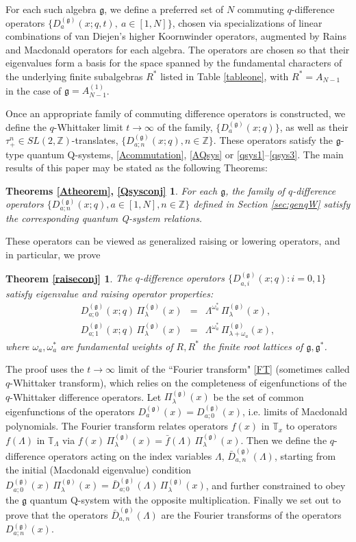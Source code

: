\documentclass[12pt]{amsart}
\newcommand{\barD}{\bar D}
\newcommand{\g}{{\mathfrak{g}}}
\newcommand{\Z}{{\mathbb Z}}
\newcommand{\lL}{{\Lambda}}
\numberwithin{equation}{section}
\begin{document}
For each such algebra $\g$, we define a preferred set of $N$ commuting $q$-difference operators $\{D_a^{(\g)}(x;q,t),\ a\in [1,N]\}$, chosen via specializations of linear combinations of van Diejen's higher Koornwinder operators, augmented by Rains and Macdonald operators for each algebra. The operators are chosen so that their eigenvalues form a basis for the space spanned by the fundamental characters of the underlying finite subalgebras $R^*$ listed in Table \ref{tableone}, with $R^*=A_{N-1}$ in the case of $\g=A_{N-1}^{(1)}$.

%
%
Once an appropriate family of commuting difference operators is constructed, we define the $q$-Whittaker limit $t\to\infty$ of the family, $\{D_{a}^{(\g)}(x;q)\}$, as well as their $\tau_+^n\in SL(2,\Z)$-translates, $\{D_{a;n}^{(\g)}(x;q), n\in\Z\}$. 
These operators satisfy the $\g$-type quantum Q-systems, \eqref{Acommutation}, \eqref{AQsys} or \eqref{qsys1}--\eqref{qsys3}. The main results of this paper may be stated as the following Theorems:

\newtheorem*{Atheorem}{Theorems \ref{Atheorem}, \ref{Qsysconj}}
\begin{Atheorem}
For each $\g$, the family of $q$-difference operators $\{D_{a;n}^{(\g)}(x;q), a\in[1,N], n\in\Z\}$ defined in Section \ref{sec:genqW} satisfy the corresponding quantum Q-system relations.
\end{Atheorem}
These operators can be viewed as generalized raising or lowering operators, and in particular, we prove
\newtheorem*{raiseconj}{Theorem \ref{raiseconj}}
\begin{raiseconj}
The $q$-difference operators $\{D_{a,i}^{(\g)}(x;q) : i=0,1\}$ satisfy eigenvalue and raising operator properties:
\begin{eqnarray*}
D_{a;0}^{(\g)}(x;q)\, \Pi_\lambda^{(\g)}(x)&=&\lL^{\omega_a^*}\,\Pi_\lambda^{(\g)}(x),\\
D_{a;1}^{(\g)}(x;q)\, \Pi_\lambda^{(\g)}(x)&=& \lL^{\omega_a^*}\, \Pi_{\lambda+\omega_a}^{(\g)}(x),
\end{eqnarray*}
where $\omega_a,\omega_a^*$ are fundamental weights of $R,R^*$ the finite root lattices of $\g,\g^*$.
\end{raiseconj}

The proof uses the $t\to\infty$ limit of the ``Fourier transform" \eqref{FT} (sometimes called $q$-Whittaker transform), which relies on the completeness of eigenfunctions of the $q$-Whittaker difference operators. Let $\Pi^{(\g)}_\lambda(x)$ be the set of common eigenfunctions of the operators $D_{a}^{(\g)}(x)=D_{a;0}^{(\g)}(x)$, i.e. limits of Macdonald polynomials. The Fourier transform relates operators $f(x)$ in $\mathbb T_x$ to operators $f(\lL)$ in $\mathbb T_\lL$ via $f(x)\, \Pi^{(\g)}_\lambda(x)=\bar f(\lL)\, \Pi^{(\g)}_\lambda(x)$.
Then we define the $q$-difference operators acting on the index variables $\lL$, $\barD_{a,n}^{(\g)}(\lL)$, starting from the initial (Macdonald eigenvalue) condition $D_{a;0}^{(\g)}(x)\,\Pi_\lambda^{(\g)}(x)=\bar D_{a;0}^{(\g)}(\lL)\,\Pi_\lambda^{(\g)}(x)$, and further constrained to obey the $\g$ quantum Q-system with the opposite multiplication. 
Finally we set out to prove that the operators $\barD_{a,n}^{(\g)}(\lL)$ are the Fourier transforms of the operators $D_{a;n}^{(\g)}(x)$.
\end{document}
